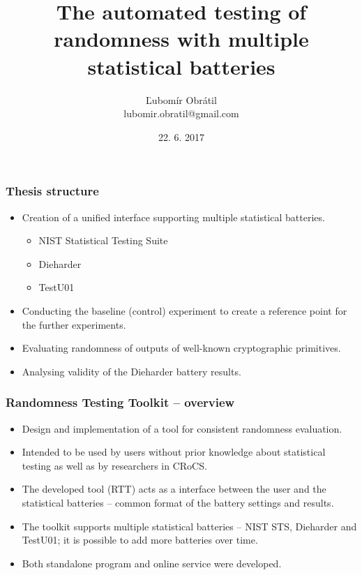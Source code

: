 \documentclass[aspectratio=169]{beamer}
\title[Randomness Testing Toolkit]{The automated testing of randomness with multiple statistical batteries} %
\author[lubomir.obratil@gmail.com]{Ľubomír Obrátil\\lubomir.obratil@gmail.com} %
\date{22. 6. 2017} %
\begin{document}
\begin{frame}
\titlepage %
\end{frame}

\begin{frame}
\frametitle{Thesis structure}

\begin{itemize}
\item Creation of a unified interface supporting multiple statistical batteries.
\begin{itemize}
\item NIST Statistical Testing Suite
\item Dieharder
\item TestU01
\end{itemize}
\item Conducting the baseline (control) experiment to create a reference point for the further experiments.
\item Evaluating randomness of outputs of well-known cryptographic primitives.
\item Analysing validity of the Dieharder battery results.
\end{itemize}

\end{frame}

\begin{frame}
\frametitle{Randomness Testing Toolkit -- overview}
\begin{itemize}
\item Design and implementation of a tool for consistent randomness evaluation.
\item Intended to be used by users without prior knowledge about statistical testing as well as by researchers in CRoCS. 
\item The developed tool (RTT) acts as a interface between the user and the statistical batteries -- common format of the battery settings and results.
\item The toolkit supports multiple statistical batteries -- NIST STS, Dieharder and TestU01; it is possible to add more batteries over time.
\item Both standalone program and online service were developed.
\end{itemize}
\end{frame}
\end{document}
